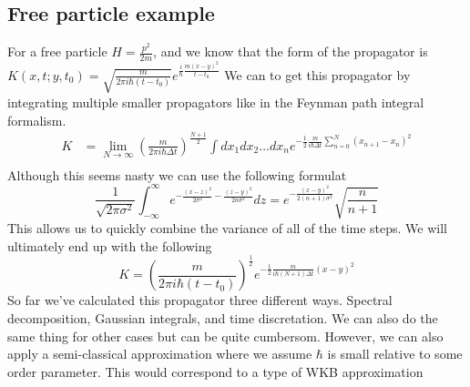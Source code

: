\subsection{Free particle example}
For a free particle $H = \frac{p^2}{2m}$, and we know that the form of the propagator is
$K(x, t; y, t_0) = \sqrt{\frac{m}{2 \pi i \hbar (t - t_0)}} 
e^{\frac{i}{\hbar} \frac{m \left(x-y\right)^2}{t - t_0}}
$
We can to get this propagator by integrating multiple smaller propagators like in the
Feynman path integral formalism.
\begin{align*}
    K
    &= \lim_{N \to \infty}
        \left(\frac{m}{2 \pi i \hbar \Delta t}\right)^{\frac{N+1}{2}}
        \int dx_1 dx_2 \dots dx_n
        e^{- \frac{1}{2} \frac{m}{i\hbar \Delta t}
            \sum_{n=0}^{N} \left(x_{n+1} - x_n\right)^2} \\
\end{align*}
Although this seems nasty we can use the following formulat
$$
    \frac{1}{\sqrt{2 \pi \sigma^2}} \int_{-\infty}^{\infty}
    e^{- \frac{\left(x-z\right)^2}{2 \sigma^2} - \frac{\left(z-y\right)^2}{2n \sigma^2}}
    dz = 
    e^{- \frac{\left(x-y\right)^2}{2(n + 1) \sigma^2}} \sqrt{\frac{n}{n+1}}
$$
This allows us to quickly combine the variance of all of the time steps. We will ultimately
end up with the following
$$
    K = 
        \left(\frac{m}{2 \pi i \hbar (t - t_0)}\right)^{\frac{1}{2}}
        e^{-\frac{1}{2} \frac{m}{i\hbar (N+1) \Delta t} \left(x-y\right)^2}
$$
So far we've calculated this propagator three different ways. Spectral decomposition,
Gaussian integrals, and time discretation. We can also do the same thing for other cases
but can be quite cumbersom. However, we can also apply a {\color{red} semi-classical approximation}
where we assume $\hbar$ is small relative to some order parameter. This would correspond to
a type of WKB approximation

